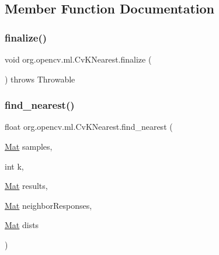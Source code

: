 \subsection{Member Function Documentation}
\mbox{\label{classorg_1_1opencv_1_1ml_1_1_cv_k_nearest_a11e3b4a4d8bfc437637fdd9ecb23ad55}} 
\subsubsection{\texorpdfstring{finalize()}{finalize()}}
{\footnotesize\ttfamily void org.\+opencv.\+ml.\+Cv\+K\+Nearest.\+finalize (\begin{DoxyParamCaption}{ }\end{DoxyParamCaption}) throws Throwable\hspace{0.3cm}{\ttfamily [protected]}}

\mbox{\label{classorg_1_1opencv_1_1ml_1_1_cv_k_nearest_a43433439f169e81fb05a101e84e3ed57}} 
\subsubsection{\texorpdfstring{find\+\_\+nearest()}{find\_nearest()}}
{\footnotesize\ttfamily float org.\+opencv.\+ml.\+Cv\+K\+Nearest.\+find\+\_\+nearest (\begin{DoxyParamCaption}\item[{\mbox{\hyperlink{classorg_1_1opencv_1_1core_1_1_mat}{Mat}}}]{samples,  }\item[{int}]{k,  }\item[{\mbox{\hyperlink{classorg_1_1opencv_1_1core_1_1_mat}{Mat}}}]{results,  }\item[{\mbox{\hyperlink{classorg_1_1opencv_1_1core_1_1_mat}{Mat}}}]{neighbor\+Responses,  }\item[{\mbox{\hyperlink{classorg_1_1opencv_1_1core_1_1_mat}{Mat}}}]{dists }\end{DoxyParamCaption})}

